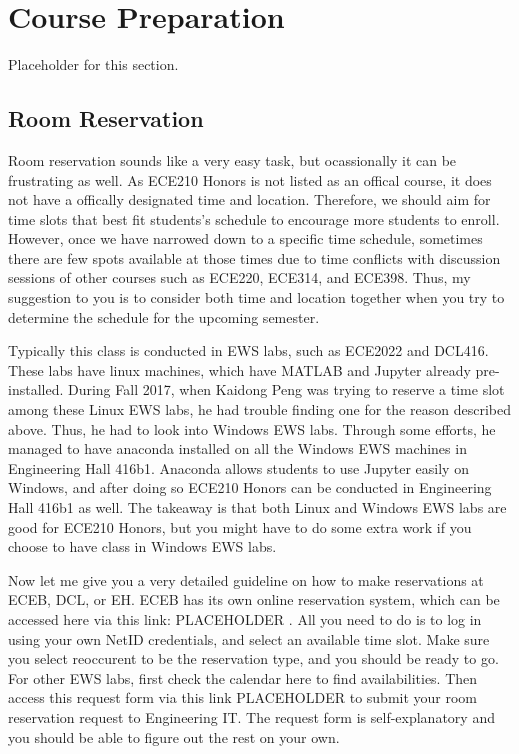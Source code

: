 \documentclass[12pt]{article}
\begin{document}
\section{Course Preparation}
    Placeholder for this section.
    \subsection{Room Reservation}
        Room reservation sounds like a very easy task, but ocassionally it can be frustrating as well. As ECE210 Honors is not listed as an offical course, it does not have a offically designated time and location. Therefore, we should aim for time slots that best fit students\rq s schedule to encourage more students to enroll. However, once we have narrowed down to a specific time schedule, sometimes there are few spots available at those times due to time conflicts with discussion sessions of other courses such as ECE220, ECE314, and ECE398. Thus, my suggestion to you is to consider both time and location together when you try to determine the schedule for the upcoming semester.

        Typically this class is conducted in EWS labs, such as ECE2022 and DCL416. These labs have linux machines, which have MATLAB and Jupyter already pre-installed. During Fall 2017, when Kaidong Peng was trying to reserve a time slot among these Linux EWS labs, he had trouble finding one for the reason described above. Thus, he had to look into Windows EWS labs. Through some efforts, he managed to have anaconda installed on all the Windows EWS machines in Engineering Hall 416b1. Anaconda allows students to use Jupyter easily on Windows, and after doing so ECE210 Honors can be conducted in Engineering Hall 416b1 as well. The takeaway is that both Linux and Windows EWS labs are good for ECE210 Honors, but you might have to do some extra work if you choose to have class in Windows EWS labs.

        Now let me give you a very detailed guideline on how to make reservations at ECEB, DCL, or EH. ECEB has its own online reservation system, which can be accessed here via this link: PLACEHOLDER . All you need to do is to log in using your own NetID credentials, and select an available time slot. Make sure you select reoccurent to be the reservation type, and you should be ready to go. For other EWS labs, first check the calendar here to find availabilities. Then access this request form via this link PLACEHOLDER to submit your room reservation request to Engineering IT. The request form is self-explanatory and you should be able to figure out the rest on your own.
\end{document}
